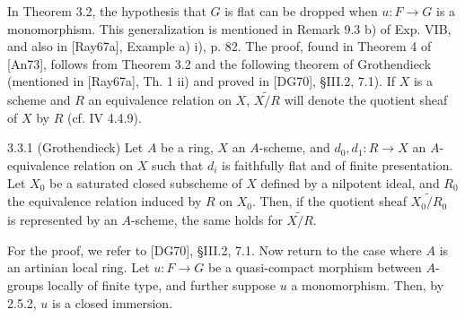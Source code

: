 In Theorem 3.2, the hypothesis that $G$ is flat can be dropped when $u:F\to G$ is a monomorphism. This generalization is mentioned in Remark 9.3 b) of Exp. VIB, and also in [Ray67a], Example a) i), p. 82. The proof, found in Theorem 4 of [An73], follows from Theorem 3.2 and the following theorem of Grothendieck (mentioned in [Ray67a], Th. 1 ii) and proved in [DG70], §III.2, 7.1). If $X$ is a scheme and $R$ an equivalence relation on $X$, $\widetilde{X/R}$ will denote the quotient \fppf sheaf of $X$ by $R$ (cf. IV 4.4.9).
\begin{theorem}{3.3.1 (Grothendieck)}\label{VIA.3.3.1}
Let $A$ be a ring, $X$ an $A$-scheme, and $d_0,d_1:R\to X$ an $A$-equivalence relation on $X$ such that $d_i$ is faithfully flat and of finite presentation. Let $X_0$ be a saturated closed subscheme of $X$ defined by a nilpotent ideal, and $R_0$ the equivalence relation induced by $R$ on $X_0$. Then, if the quotient \fppf sheaf $\widetilde{X_0/R_0}$ is represented by an $A$-scheme, the same holds for $\widetilde{X/R}$.
\end{theorem}
For the proof, we refer to [DG70], §III.2, 7.1. Now return to the case where $A$ is an artinian local ring. Let $u:F\to G$ be a quasi-compact morphism between $A$-groups locally of finite type, and further suppose $u$ a monomorphism. Then, by 2.5.2, $u$ is a closed immersion.

